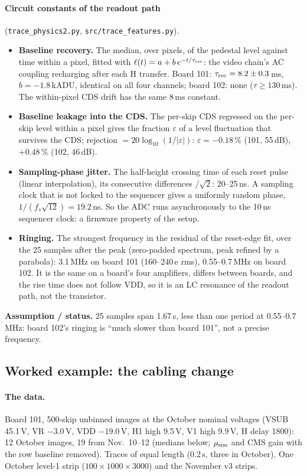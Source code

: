 \documentclass[10pt,a4paper]{article}
\newcommand{\code}[1]{\texttt{\small #1}}
\newcommand{\caveat}[1]{\par\smallskip\noindent\colorbox{orange!10}{\parbox{\dimexpr\linewidth-2\fboxsep}{\small\textbf{Assumption / status.} #1}}\par\smallskip}
\begin{document}
\paragraph{Circuit constants of the readout path} (\code{trace\_physics2.py}, \code{src/trace\_features.py}).
\begin{itemize}
\item \textbf{Baseline recovery.} The median, over pixels, of the pedestal level against time within a pixel, fitted
with $\ell(t)=a+b\,e^{-t/\tau_{\rm rec}}$: the video chain's AC coupling recharging after each H transfer.
Board 101: $\tau_{\rm rec}=8.2\pm0.3$\,ms, $b=-1.8$\,kADU, identical on all four channels; board 102: none
($\tau\ge130$\,ms). The within-pixel CDS drift has the same 8\,ms constant.
\item \textbf{Baseline leakage into the CDS.} The per-skip CDS regressed on the per-skip level within a pixel gives the
fraction $\varepsilon$ of a level fluctuation that survives the CDS; rejection $=20\log_{10}(1/|\varepsilon|)$:
$\varepsilon=-0.18\,\%$ (101, 55\,dB), $+0.48\,\%$ (102, 46\,dB).
\item \textbf{Sampling-phase jitter.} The half-height crossing time of each reset pulse (linear interpolation), its
consecutive differences $/\sqrt2$: 20--25\,ns. A sampling clock that is not locked to the sequencer gives a uniformly
random phase, $1/(f_s\sqrt{12})=19.2$\,ns. So the ADC runs asynchronously to the 10\,ns sequencer clock: a firmware
property of the setup.
\item \textbf{Ringing.} The strongest frequency in the residual of the reset-edge fit, over the 25 samples after the
peak (zero-padded spectrum, peak refined by a parabola): 3.1\,MHz on board 101 (160--240\,e rms), 0.55--0.7\,MHz on
board 102. It is the same on a board's four amplifiers, differs between boards, and the rise time does not follow VDD,
so it is an LC resonance of the readout path, not the transistor.
\end{itemize}
\caveat{25 samples span 1.67\,\textmu s, less than one period at 0.55--0.7\,MHz: board 102's ringing is ``much slower
than board 101'', not a precise frequency.}

\subsection{Worked example: the cabling change}\label{sec:cabling}

\paragraph{The data.} Board 101, 500-skip unbinned images at the October nominal voltages (VSUB 45.1\,V, VR
$-3.0$\,V, VDD $-19.0$\,V, H1 high 9.5\,V, V1 high 9.9\,V, H delay 1800): 12 October images, 19 from Nov.\ 10--12
(medians below; $\rho_{\rm sim}$ and CMS gain with the row baseline removed). Traces of equal length (0.2\,s, three in October). One October level-1 strip
($100\times1000\times3000$) and the November v3 strips.
\end{document}
